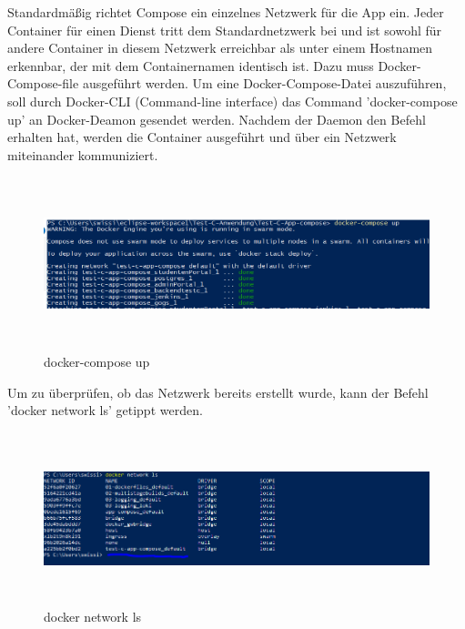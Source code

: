 \documentclass[a4paper,12pt,oneside]{book}
\begin{document}
\newline
Standardmäßig richtet Compose ein einzelnes Netzwerk für die App ein. Jeder Container für einen Dienst tritt dem Standardnetzwerk bei und ist sowohl für andere Container in diesem Netzwerk erreichbar als unter einem Hostnamen erkennbar, der mit dem Containernamen identisch ist. 
\newline
Dazu muss Docker-Compose-file ausgeführt werden. Um eine Docker-Compose-Datei auszuführen, soll durch Docker-CLI (Command-line interface) das Command 'docker-compose up' an Docker-Deamon gesendet werden.
\newline
Nachdem der Daemon den Befehl erhalten hat, werden die Container ausgeführt und über ein Netzwerk miteinander kommuniziert.
\begin{figure}[h!]
	\begin{center}
		\includegraphics[width=17cm, height=5cm]{composeUp.PNG}
		\caption{docker-compose up} 
		\label{docker-compose up} 
	\end{center}
\end{figure}
\newline
Um zu überprüfen, ob das Netzwerk bereits erstellt wurde, kann der Befehl 'docker network ls' getippt werden.
\newpage
\begin{figure}[h!]
	\begin{center}
		\includegraphics[width=17cm, height=5cm]{docker-network-ls.PNG}
		\caption{docker network ls} 
		\label{docker network ls} 
	\end{center}
\end{figure}
\end{document}
